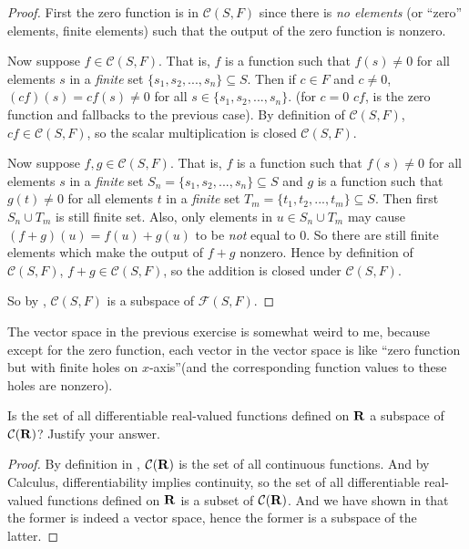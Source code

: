 \begin{proof}
First the zero function is in \(\mathcal{C}(S, F)\) since there is \emph{no elements} (or ``zero'' elements, finite elements) such that the output of the zero function is nonzero.

Now suppose \(f \in \mathcal{C}(S, F)\).
That is, \(f\) is a function such that \(f(s) \ne 0\) for all elements \(s\) in a \emph{finite} set \(\{ s_1, s_2, ..., s_n \} \subseteq S\).
Then if \(c \in F\) and \(c \ne 0\), \((cf)(s) = cf(s) \ne 0\) for all \(s \in \{ s_1, s_2, ..., s_n \} \).
(for \(c = 0\) \(cf\), is the zero function and fallbacks to the previous case).
By definition of \(\mathcal{C}(S, F)\), \(cf \in \mathcal{C}(S, F)\), so the scalar multiplication is closed  \(\mathcal{C}(S, F)\).

Now suppose \(f, g \in \mathcal{C}(S, F)\).
That is, \(f\) is a function such that \(f(s) \ne 0\) for all elements \(s\) in a \emph{finite} set \(S_n = \{ s_1, s_2, ..., s_n \} \subseteq S \) and \(g\) is a function such that \(g(t) \ne 0\) for all elements \(t\) in a \emph{finite} set \(T_m = \{ t_1, t_2, ..., t_m \} \subseteq S\).
Then first \(S_n \cup T_m\) is still finite set.
Also, only elements in \(u \in S_n \cup T_m\) may cause \((f + g)(u) = f(u) + g(u)\) to be \emph{not} equal to \(0\).
So there are still finite elements which make the output of \(f + g\) nonzero.
Hence by definition of \(\mathcal{C}(S, F)\), \(f + g \in \mathcal{C}(S, F)\), so the addition is closed under \(\mathcal{C}(S, F)\).

So by , \(\mathcal{C}(S, F)\) is a subspace of \(\mathcal{F}(S, F)\).
\end{proof}

\begin{note}
The vector space in the previous exercise is somewhat weird to me, because except for the zero function, each vector in the vector space is like ``zero function but with finite holes on \(x\)-axis''(and the corresponding function values to these holes are nonzero).
\end{note}

\begin{exercise} \label{exercise 1.3.15}
Is the set of all differentiable real-valued functions defined on \(\mathbf{R}\) a subspace of \(\mathcal{C}(\mathbf{R})\)?
Justify your answer.
\end{exercise}

\begin{proof}
By definition in , \(\mathcal{C}(\mathbf{R})\) is the set of all continuous functions.
And by Calculus, differentiability implies continuity, so the set of all differentiable real-valued functions defined on \(\mathbf{R}\) is a subset of \(\mathcal{C}(\mathbf{R})\).
And we have shown in  that the former is indeed a vector space, hence the former is a subspace of the latter.
\end{proof}

